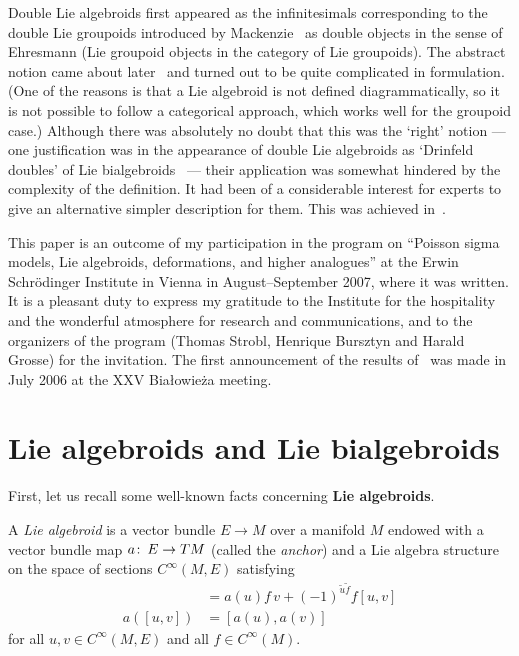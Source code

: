 \documentclass[12pt,reqno,a4paper]{amsart}
\theoremstyle{definition}
\begin{document}
Double Lie algebroids first appeared as the infinitesimals  corresponding to the double Lie groupoids introduced by Mackenzie~\cite{mackenzie:secondorder1, mackenzie:secondorder2} as double objects in the sense  of Ehresmann (Lie groupoid objects in the category of Lie groupoids). The abstract notion came about later~\cite{mackenzie:doublealg, mackenzie:doublealg2, mackenzie:drinfeld} and turned out to be quite complicated in formulation. (One of the  reasons is that  a Lie algebroid is not defined diagrammatically, so it is not possible to follow a categorical approach, which works well for the groupoid case.) Although there was absolutely no doubt that this was the `right' notion --- one justification was in the appearance of double Lie algebroids as `Drinfeld doubles' of Lie bialgebroids~\cite{mackenzie:drinfeld} --- their application was somewhat hindered by the complexity of the definition. It had been of a considerable interest for experts to give an alternative simpler description for them. This was achieved in~\cite{tv:double}.

This paper is an outcome of my participation in the program  on
``Poisson sigma models, Lie algebroids, deformations, and higher
analogues'' at the Erwin Schr\"odinger Institute in Vienna in
August--Sep\-tem\-ber 2007, where it was written. It is a pleasant
duty to express my gratitude to the Institute for the  hospitality
and the wonderful atmosphere for research and communications,  and
to the organizers of the program (Thomas Strobl,  Henrique Bursztyn
and Harald Grosse) for the invitation. The first announcement of the
results of~\cite{tv:double} was made in July 2006 at the XXV
Bia{\l}owie\.{z}a meeting.

\section{Lie algebroids and Lie bialgebroids}

First, let us recall some well-known facts concerning \textbf{Lie
algebroids}.

A \textit{Lie algebroid} is a vector bundle $E\to M$ over a manifold
$M$ endowed with a vector bundle map $a{\colon\thinspace} E\to TM$ (called the
\textit{anchor}) and a Lie algebra structure on the space of
sections ${C^{\infty}}(M,E)$ satisfying
\begin{align}
  [u,fv]&={a(u)}f\,v+(-1)^{{{\tilde u}}{{\tilde f}}}f[u,v] \label{lr1}\\
  a([u,v])&= [a(u),a(v)]\label{lr2}
\end{align}
for all $u,v\in {C^{\infty}}(M,E)$ and all $f\in {C^{\infty}}(M)$.
\end{document}
